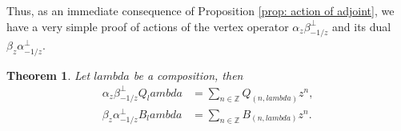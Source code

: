 \documentclass[12pt]{amsart}%
\def\lambda{lambda}%
\newtheorem{theorem}{Theorem}[section]
\theoremstyle{remark}
\theoremstyle{definition}
\newcommand{\Z}{\mathbb{Z}}
\begin{document}
    Thus, as an immediate consequence of Proposition \ref{prop: action of adjoint}, we have a very simple proof of actions of the vertex operator $\alpha_z\beta_{-1/z}^\perp$ and its dual $\beta_z\alpha_{-1/z}^\perp$.
    
    \begin{theorem}\label{thm: vertex operators}
        Let $\lambda$ be a composition, then
        \begin{align}
            \alpha_z\beta_{-1/z}^\perp Q_\lambda&=\sum_{n\in\Z}Q_{(n,\lambda)}z^n,\label{eqn: vertex op action1}\\
            \beta_z\alpha_{-1/z}^\perp B_\lambda&=\sum_{n\in\Z}B_{(n,\lambda)}z^n.\label{eqn: vertex op action2}
        \end{align}
    \end{theorem}
\end{document}

